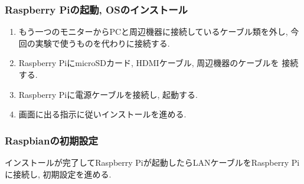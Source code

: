 \documentclass[titlepage]{jsarticle}
\begin{document}
        \subsubsection{Raspberry Piの起動, OSのインストール}
            \begin{enumerate}
                \item もう一つのモニターからPCと周辺機器に接続しているケーブル類を外し,
                    今回の実験で使うものを代わりに接続する.
                \item Raspberry PiにmicroSDカード, HDMIケーブル, 周辺機器のケーブルを
                    接続する.
                \item Raspberry Piに電源ケーブルを接続し, 起動する.
                \item 画面に出る指示に従いインストールを進める.
            \end{enumerate}

        \subsubsection{Raspbianの初期設定}
            インストールが完了してRaspberry Piが起動したらLANケーブルをRaspberry Pi
            に接続し, 初期設定を進める.
\end{document}
